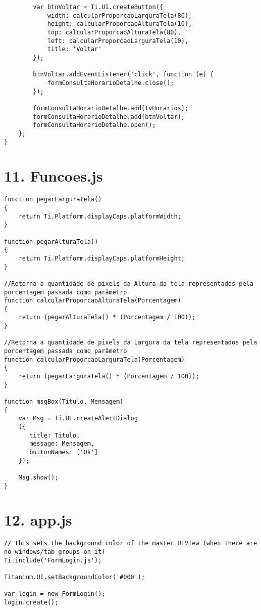 \begin{lstlisting}
        var btnVoltar = Ti.UI.createButton({
            width: calcularProporcaoLarguraTela(80),
            height: calcularProporcaoAlturaTela(10),
            top: calcularProporcaoAlturaTela(80),
            left: calcularProporcaoLarguraTela(10),
            title: 'Voltar'
        });

        btnVoltar.addEventListener('click', function (e) {
            formConsultaHorarioDetalhe.close();
        });

        formConsultaHorarioDetalhe.add(tvHorarios);
        formConsultaHorarioDetalhe.add(btnVoltar);
        formConsultaHorarioDetalhe.open();
    };
}
\end{lstlisting}

\section*{11. Funcoes.js}
\begin{lstlisting}
function pegarLarguraTela()
{
	return Ti.Platform.displayCaps.platformWidth;
}

function pegarAlturaTela()
{
	return Ti.Platform.displayCaps.platformHeight;
}

//Retorna a quantidade de pixels da Altura da tela representados pela porcentagem passada como parâmetro
function calcularProporcaoAlturaTela(Porcentagem)
{
	return (pegarAlturaTela() * (Porcentagem / 100));
}

//Retorna a quantidade de pixels da Largura da tela representados pela porcentagem passada como parâmetro
function calcularProporcaoLarguraTela(Porcentagem)
{
	return (pegarLarguraTela() * (Porcentagem / 100));
}

function msgBox(Titulo, Mensagem)
{
	var Msg = Ti.UI.createAlertDialog
	({
	   title: Titulo,
	   message: Mensagem,
	   buttonNames: ['Ok']	
	});
	
	Msg.show();
}
\end{lstlisting}

\section*{12. app.js}
\begin{lstlisting}
// this sets the background color of the master UIView (when there are no windows/tab groups on it)
Ti.include('FormLogin.js');

Titanium.UI.setBackgroundColor('#000');

var login = new FormLogin();
login.create();
\end{lstlisting}
